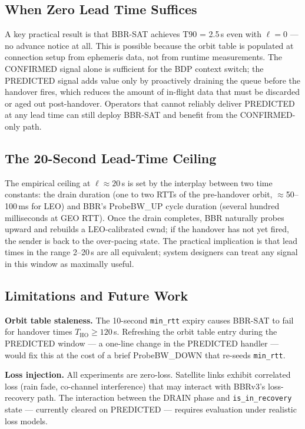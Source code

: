 \documentclass[conference]{IEEEtran}
\begin{document}
\subsection{When Zero Lead Time Suffices}

A key practical result is that BBR-SAT achieves T90 = 2.5\,s even with
$\ell = 0$ --- no advance notice at all.
This is possible because the orbit table is populated at connection setup
from ephemeris data, not from runtime measurements.
The CONFIRMED signal alone is sufficient for the BDP context switch; the
PREDICTED signal adds value only by proactively draining the queue before
the handover fires, which reduces the amount of in-flight data that must be
discarded or aged out post-handover.
Operators that cannot reliably deliver PREDICTED at any lead time can
still deploy BBR-SAT and benefit from the CONFIRMED-only path.

\subsection{The 20-Second Lead-Time Ceiling}

The empirical ceiling at $\ell \approx 20$\,s is set by the interplay
between two time constants: the drain duration (one to two RTTs of the
pre-handover orbit, $\approx$50--100\,ms for LEO) and BBR's
ProbeBW\_UP cycle duration (several hundred milliseconds at GEO RTT).
Once the drain completes, BBR naturally probes upward and rebuilds a
LEO-calibrated cwnd; if the handover has not yet fired, the sender
is back to the over-pacing state.
The practical implication is that lead times in the range 2--20\,s are
all equivalent; system designers can treat any signal in this window as
maximally useful.

\subsection{Limitations and Future Work}

\textbf{Orbit table staleness.}
The 10-second \texttt{min\_rtt} expiry causes BBR-SAT to fail for
handover times $T_\mathrm{HO} \geq 120$\,s.
Refreshing the orbit table entry during the PREDICTED window --- a
one-line change in the PREDICTED handler --- would fix this at the
cost of a brief ProbeBW\_DOWN that re-seeds \texttt{min\_rtt}.

\textbf{Loss injection.}
All experiments are zero-loss.
Satellite links exhibit correlated loss (rain fade, co-channel interference)
that may interact with BBRv3's loss-recovery path.
The interaction between the DRAIN phase and \texttt{is\_in\_recovery}
state --- currently cleared on PREDICTED --- requires evaluation under
realistic loss models.
\end{document}
